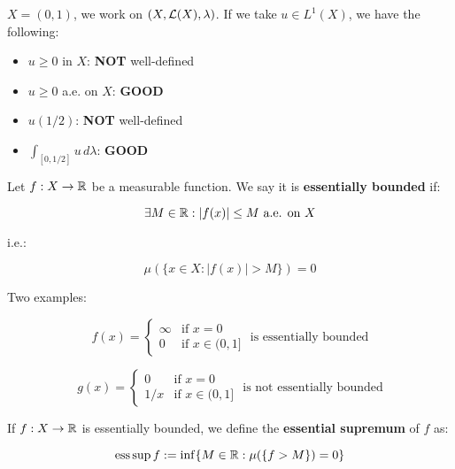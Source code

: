 \begin{fexample}
    $X = (0, 1)$, we work on $(X, \mathcal{L}(X), \lambda)$. If we take
    $u \in L^1(X)$, we have the following:

    \vspace{1em}
    \begin{itemize}
        \item $u \geq 0$ in $X$: \textbf{NOT} well-defined
        \vspace{1em}

        \item $u \geq 0$ a.e. on $X$: \textbf{GOOD}
        \vspace{1em}

        \item $u(1/2)$: \textbf{NOT} well-defined
        \vspace{1em}

        \item $\int_{[0, 1/2]} u \, d\lambda$: \textbf{GOOD}
    \end{itemize}
\end{fexample}

\vspace{1em}

\begin{fdefinition}
    Let $f: X \to \mathbb{R}$ be a measurable function. We say it is
    \textbf{essentially bounded} if:

    $$\exists M \in \mathbb{R}: |f(x)| \leq M \text{ a.e. on } X$$

    i.e.:

    $$\mu(\{x \in X: |f(x)| > M\}) = 0$$
\end{fdefinition}

\begin{example}
    Two examples:

    $$f(x) = \begin{cases}
        \infty & \text{if } x = 0\\
        0 & \text{if } x \in (0, 1] 
    \end{cases} \text{ is essentially bounded}
    $$

    $$g(x) = \begin{cases}
        0 & \text{if } x = 0\\
        1/x & \text{if } x \in (0, 1]
    \end{cases} \text{ is not essentially bounded}
    $$

\end{example}

\begin{fdefinition}
    If $f: X \to \mathbb{R}$ is essentially bounded, we define the
    \textbf{essential supremum} of $f$ as:

    $$\operatorname{ess\,sup} f := \inf\{M \in \mathbb{R}: \mu(\{f > M\}) = 0\}$$

\end{fdefinition}

